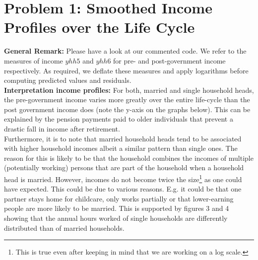 \documentclass[12pt,a4paper]{article}
\begin{document}
\newpage


\section*{Problem 1: Smoothed Income Profiles over the Life Cycle}

\textbf{General Remark:} Please have a look at our commented code. We refer to the measures of income $yhh5$ and $yhh6$ for pre- and post-government income respectively. As required, we deflate these measures and apply logarithms before computing predicted values and residuals. \\

\textbf{Interpretation income profiles:} For both, married and single household heads, the pre-government income varies more greatly over the entire life-cycle than the post government income does (note the y-axis on the graphs below). This can be explained by the pension payments paid to older individuals that prevent a drastic fall in income after retirement. \\ Furthermore, it is to note that married household heads tend to be associated with higher household incomes albeit a similar pattern than single ones. The reason for this is likely to be that the household combines the incomes of multiple (potentially working) persons that are part of the household when a household head is married. However, incomes do not become twice the size\footnote{This is true even after keeping in mind that we are working on a log scale.} as one could have expected. This could be due to various reasons. E.g. it could be that one partner stays home for childcare, only works partially or that lower-earning people are more likely to be married. This is supported by figures 3 and 4 showing that the annual hours worked of single households are differently distributed than of married households. \\
\end{document}
